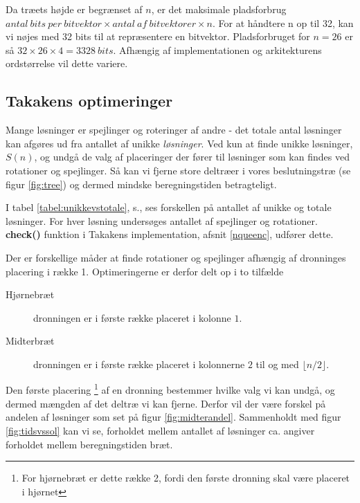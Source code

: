 \documentclass[draft,a4paper,11pt]{article}
\begin{document}
Da træets højde er begrænset af $n$, er det maksimale pladsforbrug $antal\ bits\ per\ bitvektor \times antal\ af\ bitvektorer \times n$. For at håndtere n op til 32, kan vi nøjes med 32 bits til at repræsentere en bitvektor. Pladsforbruget for $n=26$ er så $32\times 26 \times 4 = 3328\ bits$. Afhængig af implementationen og arkitekturens ordstørrelse vil dette variere. 

\subsection{Takakens optimeringer}\label{takalgo}

Mange løsninger er spejlinger og roteringer af andre - det totale antal løsninger kan afgøres ud fra antallet af unikke \emph{løsninger}. Ved kun at finde unikke løsninger, $S(n)$, og undgå de valg af placeringer der fører til løsninger som kan findes ved rotationer og spejlinger. Så kan vi fjerne store deltræer i vores beslutningstræ (se figur \ref{fig:tree}) og dermed mindske beregningstiden betragteligt.

I tabel \ref{tabel:unikkevstotale}, s.\pageref{tabel:unikkevstotale}, ses forskellen på antallet af unikke og totale løsninger. For hver løsning undersøges antallet af spejlinger og rotationer. \textbf{check()} funktion i Takakens implementation, afsnit \ref{nqueenc}, udfører dette. 
 
Der er forskellige måder at finde rotationer og spejlinger afhængig af dronninges placering i række 1. Optimeringerne er derfor delt op i to tilfælde

\begin{description}
	\item[Hjørnebræt] dronningen er i første række placeret i kolonne $1$.
	\item[Midterbræt] dronningen er i første række placeret i kolonnerne $2$  til og med $\lfloor n/2 \rfloor$.
\end{description}

Den første placering \footnote{For hjørnebræt er dette række 2, fordi den første dronning skal være placeret i hjørnet} af en dronning bestemmer hvilke valg vi kan undgå, og dermed mængden af det deltræ vi kan fjerne. Derfor vil der være forskel på andelen af løsninger som set på figur \ref{fig:midterandel}. Sammenholdt med figur \ref{fig:tidsvssol} kan vi se, forholdet mellem antallet af løsninger ca. angiver forholdet mellem beregningstiden bræt.
\end{document}
